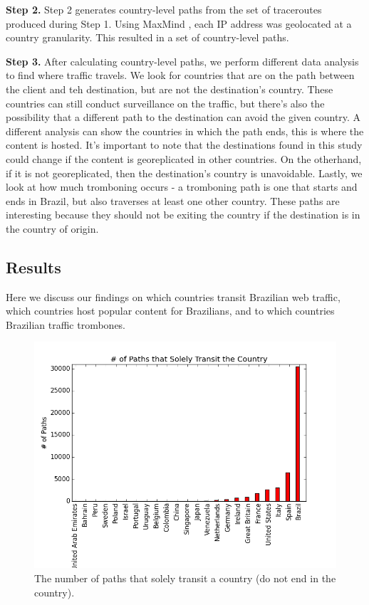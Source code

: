 {\bf Step 2.}  Step 2 generates country-level paths from the set of traceroutes produced during Step 1.  Using MaxMind , each IP address was geolocated at a country granularity.  This resulted in a set of country-level paths.  

{\bf Step 3.}  After calculating country-level paths, we perform different data analysis to find where traffic travels.  We look for countries that are on the path between the client and teh destination, but are not the destination's country.  These countries can still conduct surveillance on the traffic, but there's also the possibility that a different path to the destination can avoid the given country.  A different analysis can show the countries in which the path ends, this is where the content is hosted.  It's important to note that the destinations found in this study could change if the content is georeplicated in other countries.  On the otherhand, if it is not georeplicated, then the destination's country is unavoidable.  Lastly, we look at how much tromboning occurs - a tromboning path is one that starts and ends in Brazil, but also traverses at least one other country.  These paths are interesting because they should not be exiting the country if the destination is in the country of origin.  

\subsection{Results}
Here we discuss our findings on which countries transit Brazilian web traffic, which countries host popular content for Brazilians, and to which countries Brazilian traffic trombones.  

\begin{figure}
\centering
\includegraphics[width=.8\textwidth]{transit_graph_no_zero}
\caption{The number of paths that solely transit a country (do not end in the country).}
\label{fig:transit}
\end{figure}

